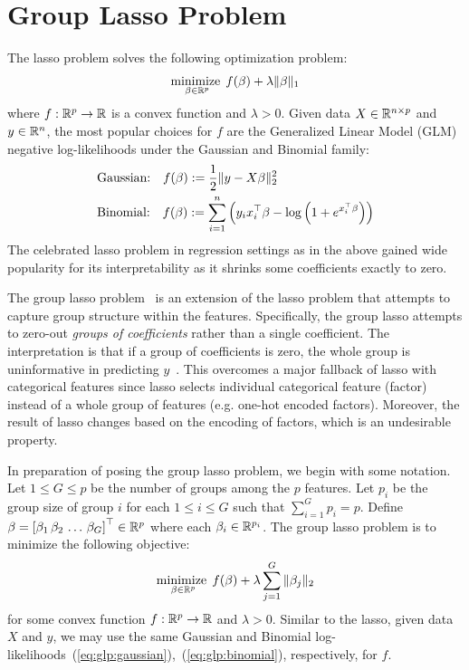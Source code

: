 \section{Group Lasso Problem}\label{sec:glp}

The lasso problem solves the following optimization problem:
\begin{align*}
    \operatorname*{minimize\;}_{\beta \in \mathbb{R}^p}
    f(\beta)
    + \lambda \|\beta\|_1
\end{align*}
where $f : \mathbb{R}^p \to \mathbb{R}$ is a convex function and $\lambda > 0$.
Given data $X \in \mathbb{R}^{n\times p}$ and $y\in \mathbb{R}^{n}$,
the most popular choices for $f$ are the Generalized Linear Model (GLM) 
negative log-likelihoods under the Gaussian and Binomial family:
\begin{align}
    &\text{Gaussian:} \quad f(\beta) := \frac{1}{2} \|y - X\beta\|_2^2 
    \label{eq:glp:gaussian}\\
    &\text{Binomial:} \quad f(\beta) := \sum\limits_{i=1}^n \left(y_i x_i^\top \beta - \log\left(1 + e^{x_i^\top \beta}\right)\right)
    \label{eq:glp:binomial}
\end{align}
The celebrated lasso problem in regression settings as in the above 
gained wide popularity for its interpretability
as it shrinks some coefficients exactly to zero.

The group lasso problem~\citep{yuan:2006} is an extension of the lasso problem
that attempts to capture group structure within the features.
Specifically, the group lasso attempts to zero-out \emph{groups of coefficients} rather than a single coefficient.
The interpretation is that if a group of coefficients is zero, 
the whole group is uninformative in predicting $y$~\citep{meier:2008}.
This overcomes a major fallback of lasso with categorical features since
lasso selects individual categorical feature (factor)
instead of a whole group of features (e.g. one-hot encoded factors).
Moreover, the result of lasso changes based on the encoding of factors, 
which is an undesirable property.

In preparation of posing the group lasso problem, we begin with some notation.
Let $1 \leq G \leq p$ be the number of groups among the $p$ features.
Let $p_i$ be the group size of group $i$ for each $1\leq i \leq G$
such that $\sum\limits_{i=1}^G p_i = p$.
Define $\beta = \left[\beta_1 \, \beta_2 \, \ldots \, \beta_G\right]^\top \in \mathbb{R}^p$
where each $\beta_i \in \mathbb{R}^{p_i}$.
The group lasso problem is to minimize the following objective:
\begin{align}
    \operatorname*{minimize\;}_{\beta \in \mathbb{R}^p}
    f(\beta)
    + \lambda \sum\limits_{j=1}^G \|\beta_j\|_2
    \label{eq:glp:objective}
\end{align}
for some convex function $f:\mathbb{R}^p \to \mathbb{R}$ and $\lambda > 0$.
Similar to the lasso, given data $X$ and $y$, we may use the same Gaussian and Binomial
log-likelihoods~(\ref{eq:glp:gaussian}),~(\ref{eq:glp:binomial}), respectively, for $f$.
